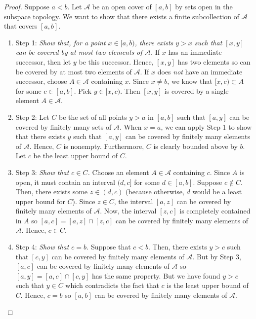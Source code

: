 \documentclass{article}
\theoremstyle{definition}
\begin{document}
\begin{flushleft}
\begin{proof}
Suppose $a < b$. Let $\mathcal{A}$ be an open cover of $[a,b]$ by sets open in the subspace topology. We want to show that there exists a finite subcollection of $\mathcal{A}$ that covers $[a,b]$.
\begin{enumerate}
    \item Step 1: \textit{Show that, for a point $x \in [a,b)$, there exists $y > x$ such that $[x,y]$ can be covered by at most two elements of $\mathcal{A}$.} If $x$ has an immediate successor, then let $y$ be this successor. Hence, $[x,y]$ has two elements so can be covered by at most two elements of $\mathcal{A}$. If $x$ does \textit{not} have an immediate successor, choose $A \in \mathcal{A}$ containing $x$. Since $x \neq b$, we know that $[x,c) \subset A$ for some $c \in [a,b]$. Pick $y \in [x,c)$. Then $[x,y]$ is covered by a single element $A \in \mathcal{A}$.
    \item Step 2: Let $C$ be the set of all points $y > a$ in $[a,b]$ such that $[a,y]$ can be covered by finitely many sets of $\mathcal{A}$. When $x = a$, we can apply Step 1 to show that there exists $y$ such that $[a,y]$ can be covered by finitely many elements of $\mathcal{A}$. Hence, $C$ is nonempty. Furthermore, $C$ is clearly bounded above by $b$. Let $c$ be the least upper bound of $C$.
    \item Step 3: \textit{Show that $c \in C$.} Choose an element $A \in \mathcal{A}$ containing $c$. Since $A$ is open, it must contain an interval $(d,c]$ for some $d \in [a,b]$. Suppose $c \notin C$. Then, there exists some $z \in (d,c)$ (because otherwise, $d$ would be a least upper bound for $C$). Since $z \in C$, the interval $[a,z]$ can be covered by finitely many elements of $\mathcal{A}$. Now, the interval $[z,c]$ is completely contained in $A$ so $[a,c] = [a,z] \cap [z,c]$ can be covered by finitely many elements of $\mathcal{A}$. Hence, $c \in C$.
    \item Step 4: \textit{Show that $c = b$.} Suppose that $c < b$. Then, there exists $y > c$ such that $[c,y]$ can be covered by finitely many elements of $\mathcal{A}$. But by Step 3, $[a,c]$ can be covered by finitely many elements of $\mathcal{A}$ so $[a,y] = [a,c] \cap [c,y]$ has the same property. But we have found $y > c$ such that $y \in C$ which contradicts the fact that $c$ is the least upper bound of $C$. Hence, $c = b$ so $[a,b]$ can be covered by finitely many elements of $\mathcal{A}$.
\end{enumerate}
\end{proof}


\end{flushleft}
\end{document}
